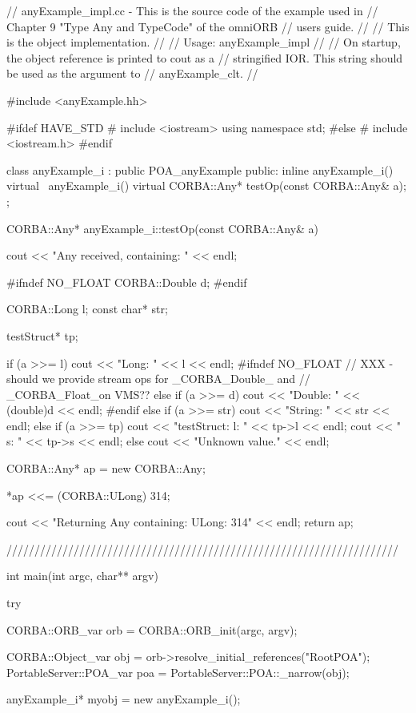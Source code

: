 \documentclass[11pt,twoside,a4paper]{book}
\begin{document}
\begin{cxxlisting}
// anyExample_impl.cc - This is the source code of the example used in
//                      Chapter 9 "Type Any and TypeCode" of the omniORB
//                      users guide.
//
//                      This is the object implementation.
//
// Usage: anyExample_impl
//
//        On startup, the object reference is printed to cout as a
//        stringified IOR. This string should be used as the argument to 
//        anyExample_clt.
//

#include <anyExample.hh>

#ifdef HAVE_STD
#  include <iostream>
   using namespace std;
#else
#  include <iostream.h>
#endif

class anyExample_i : public POA_anyExample {
public:
  inline anyExample_i() {}
  virtual ~anyExample_i() {}
  virtual CORBA::Any* testOp(const CORBA::Any& a);
};


CORBA::Any* anyExample_i::testOp(const CORBA::Any& a)
{
  cout << "Any received, containing: " << endl;

#ifndef NO_FLOAT
  CORBA::Double d;
#endif

  CORBA::Long l;
  const char* str;

  testStruct* tp;


  if (a >>= l) {
    cout << "Long: " << l << endl;
  }
#ifndef NO_FLOAT
  // XXX - should we provide stream ops for _CORBA_Double_ and
  // _CORBA_Float_on VMS??
  else if (a >>= d) {
    cout << "Double: " << (double)d << endl;
  }
#endif
  else if (a >>= str) {
    cout << "String: " << str << endl;
  }
  else if (a >>= tp) {
    cout << "testStruct: l: " << tp->l << endl;
    cout << "            s: " << tp->s << endl;
  }
  else {
    cout << "Unknown value." << endl;
  }

  CORBA::Any* ap = new CORBA::Any;

  *ap <<= (CORBA::ULong) 314;

  cout << "Returning Any containing: ULong: 314\n" << endl;
  return ap;
}

//////////////////////////////////////////////////////////////////////

int main(int argc, char** argv)
{
  try {
    CORBA::ORB_var orb = CORBA::ORB_init(argc, argv);

    CORBA::Object_var obj = orb->resolve_initial_references("RootPOA");
    PortableServer::POA_var poa = PortableServer::POA::_narrow(obj);

    anyExample_i* myobj = new anyExample_i();

}}
\end{cxxlisting}
\end{document}
